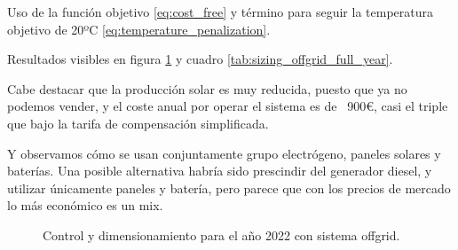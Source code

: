 Uso de la función objetivo \eqref{eq:cost_free} y término para seguir la
temperatura objetivo de 20ºC \eqref{eq:temperature_penalization}.

Resultados visibles en figura \ref{fig:sizing_offgrid_full_year} y cuadro
\ref{tab:sizing_offgrid_full_year}.

Cabe destacar que la producción solar es muy reducida, puesto que ya no podemos
vender, y el coste anual por operar el sistema es de ~900\euro, casi el triple
que bajo la tarifa de compensación simplificada.

Y observamos cómo se usan conjuntamente grupo electrógeno, paneles solares y
baterías. Una posible alternativa habría sido prescindir del generador diesel,
y utilizar únicamente paneles y batería, pero parece que con los precios de
mercado lo más económico es un mix.

\begin{figure}[h] \centering
	\centering
	
	\caption{Control y dimensionamiento para el año 2022 con sistema offgrid.}
	\label{fig:sizing_offgrid_full_year}
\end{figure}

